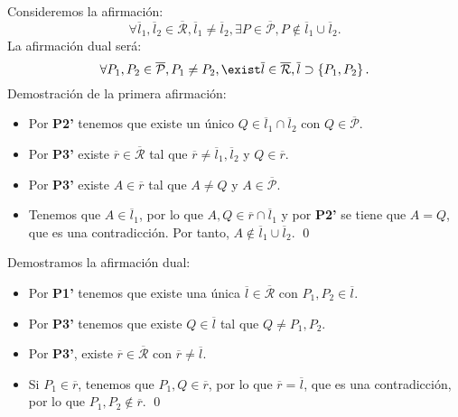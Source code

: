 \begin{eg}
Consideremos la afirmación: 
\[ \forall \overline{l}_{1}, \overline{l}_{2} \in \overline{\mathcal{R}}, \overline{l}_{1} \neq \overline{l}_{2}, \exists P \in \overline{\mathcal{P}}, P \not\in \overline{l}_{1} \cup \overline{l}_{2}.\]
La afirmación dual será:
\[\forall P_{1}, P_{2} \in \overline{\mathcal{P}}, P_{1} \neq P_{2}, \exist \overline{l} \in \overline{\mathcal{R}}, \overline{l} \supset \left\{ P_{1}, P_{2}\right\}  .\]
Demostración de la primera afirmación: 
\begin{itemize}
\item Por \textbf{P2'} tenemos que existe un único $\displaystyle Q \in \overline{l}_{1} \cap \overline{l}_{2} $ con $\displaystyle Q \in \overline{\mathcal{P}} $.
\item Por \textbf{P3'} existe $\displaystyle \overline{r} \in \overline{\mathcal{R}} $ tal que $\displaystyle \overline{r} \neq \overline{l}_{1}, \overline{l}_{2} $ y $\displaystyle Q \in \overline{r} $.
\item Por \textbf{P3'} existe $\displaystyle A \in \overline{r} $ tal que $\displaystyle A \neq Q $ y $\displaystyle A \in \overline{\mathcal{P}} $.
\item Tenemos que $\displaystyle A \in \overline{l}_{1} $, por lo que $\displaystyle A,Q \in \overline{r} \cap \overline{l}_{1} $ y por \textbf{P2'} se tiene que $\displaystyle A = Q $, que es una contradicción. Por tanto, $\displaystyle A \not\in \overline{l}_{1} \cup \overline{l}_{2} $. \qed
\end{itemize}
Demostramos la afirmación dual: 
\begin{itemize}
\item Por \textbf{P1'} tenemos que existe una única $\displaystyle \overline{l} \in \overline{\mathcal{R}} $ con $\displaystyle P_{1}, P_{2 } \in \overline{l} $.
\item Por \textbf{P3'} tenemos que existe $\displaystyle Q \in \overline{l} $ tal que $\displaystyle Q \neq P_{1}, P_{2} $.
\item Por \textbf{P3'}, existe $\displaystyle \overline{r} \in \overline{\mathcal{R}} $ con $\displaystyle \overline{r} \neq \overline{l} $.
\item Si $\displaystyle P_{1} \in \overline{r} $, tenemos que $\displaystyle P_{1}, Q \in \overline{r} $, por lo que $\displaystyle \overline{r} = \overline{l} $, que es una contradicción, por lo que $\displaystyle P_{1}, P_{2} \not\in \overline{r} $. \qed
\end{itemize}
\end{eg}
